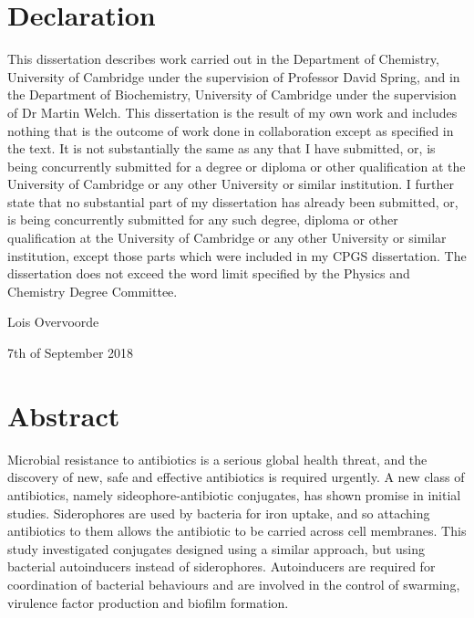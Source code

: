 \newpage

\section{Declaration}

This dissertation describes work carried out in the Department of Chemistry, University of Cambridge under the supervision of Professor David Spring, and in the Department of Biochemistry, University of Cambridge under the supervision of Dr Martin Welch. 
This dissertation is the result of my own work and includes nothing that is the outcome of work done in collaboration except as specified in the text. 
It is not substantially the same as any that I have submitted, or, is being concurrently submitted for a degree or diploma or other qualification at the University of Cambridge or any other University or similar institution. 
I further state that no substantial part of my dissertation has already been submitted, or, is being concurrently submitted for any such degree, diploma or other qualification at the University of Cambridge or any other University or similar institution, except those parts which were included in my CPGS dissertation.
The dissertation does not exceed the word limit specified by the Physics and Chemistry Degree Committee.








\vspace{5cm}



Lois Overvoorde

7th of September 2018

\newpage

\section{Abstract}

Microbial resistance to antibiotics is a serious global health threat, and the discovery of new, safe and effective antibiotics is required urgently. A new class of antibiotics, namely sideophore-antibiotic conjugates, has shown promise in initial studies. Siderophores are used by bacteria for iron uptake, and so attaching antibiotics to them allows the antibiotic to be carried across cell membranes. This study investigated conjugates designed using a similar approach, but using bacterial autoinducers instead of siderophores. Autoinducers are required for coordination of bacterial behaviours and are involved in the control of swarming, virulence factor production and biofilm formation. 

